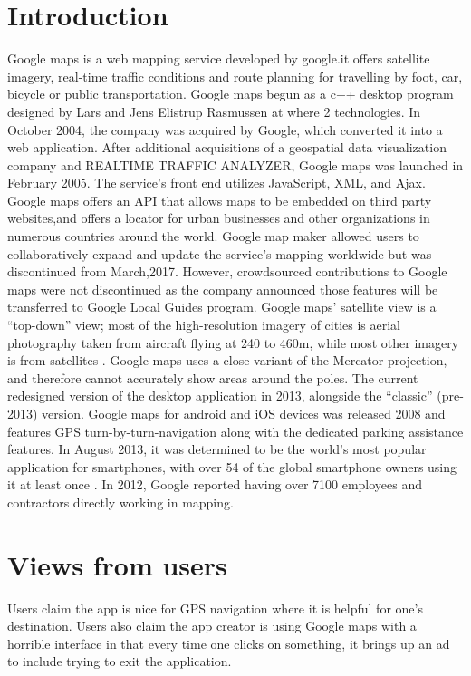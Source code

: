 \documentclass[10pt,]{article}
\begin{document}
\newpage

\section{Introduction}
Google maps is a web mapping service developed by google.it offers satellite imagery, real-time traffic conditions and route planning for travelling by foot, car, bicycle or public transportation. 
Google maps begun as a c++ desktop program designed by Lars and Jens Elistrup Rasmussen at where 2 technologies. In October 2004, the company was acquired by Google, which converted it into a web application. After additional acquisitions of a geospatial data visualization company and REALTIME TRAFFIC ANALYZER, Google maps was launched in February 2005\cite{s1}. The service’s front end utilizes JavaScript, XML, and Ajax.
Google maps offers an API that allows maps to be embedded on third party websites,and offers a locator for urban businesses and other organizations in numerous countries around the world. Google map maker allowed users to collaboratively expand and update the service’s mapping worldwide but was discontinued from March,2017. However, crowdsourced contributions to Google maps were not discontinued as the company announced those features will be transferred to Google Local Guides program\cite{s3}.
Google maps’ satellite view is a “top-down” view; most of the high-resolution imagery of cities is aerial photography taken from aircraft flying at 240 to 460m, while most other imagery is from satellites . Google maps uses a close variant of the Mercator projection, and therefore cannot accurately show areas around the poles.
The current redesigned version of the desktop application in 2013, alongside the “classic” (pre-2013) version. Google maps for android and iOS devices was released 2008 and features GPS turn-by-turn-navigation along with the dedicated parking assistance features. In August 2013, it was determined to be the world’s most popular application for smartphones, with over 54 of the global smartphone owners using it at least once \cite{s5}.
In 2012, Google reported having over 7100 employees and contractors directly working in mapping. \cite{s4}

\section{Views from users}
Users claim the app is nice for GPS navigation where it is helpful for one’s destination.
Users also claim the app creator is using Google maps with a horrible interface in that every time one clicks on something, it brings up an ad to include trying to exit the application.




   
\end{document}
